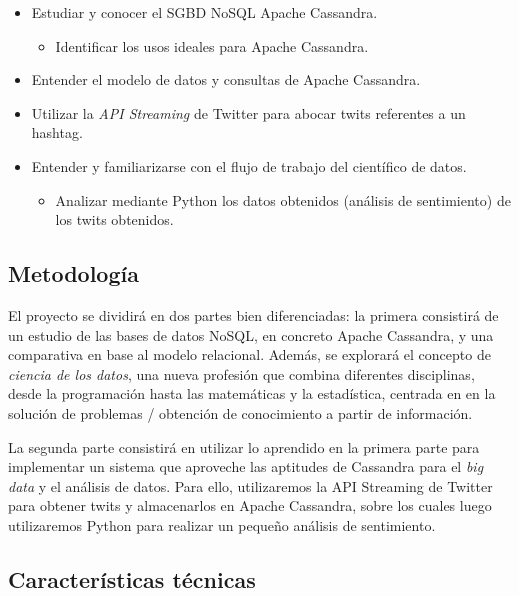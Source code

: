 \begin{itemize}
    \item Estudiar y conocer el SGBD NoSQL Apache Cassandra.
      \begin{itemize}
      \item Identificar los usos ideales para Apache Cassandra.
      \end{itemize}
    \item Entender el modelo de datos y consultas de Apache Cassandra.
    \item Utilizar la \emph{API Streaming} de Twitter para abocar twits
      referentes a un hashtag.
    \item Entender y familiarizarse con el flujo de trabajo del científico de datos.
      \begin{itemize}
      \item Analizar mediante Python los datos obtenidos (análisis de
        sentimiento) de los twits obtenidos.
      \end{itemize}
\end{itemize}

\subsection{Metodología}
\label{subsec:metodologia}

El proyecto se dividirá en dos partes bien diferenciadas: la primera consistirá
de un estudio de las bases de datos NoSQL, en concreto Apache Cassandra, y una
comparativa en base al modelo relacional. Además, se explorará el concepto de
\emph{ciencia de los datos}, una nueva profesión que combina diferentes
disciplinas, desde la programación hasta las matemáticas y la estadística,
centrada en en la solución de problemas / obtención de conocimiento a partir de información.

La segunda parte consistirá en utilizar lo aprendido en la primera parte para
implementar un sistema que aproveche las aptitudes de Cassandra para el
\emph{big data} y el análisis de datos. Para ello, utilizaremos la API Streaming
de Twitter para obtener twits y almacenarlos en Apache Cassandra, sobre los
cuales luego utilizaremos Python para realizar un pequeño análisis de sentimiento.

\subsection{Características técnicas}
\label{subsec:planificació}

